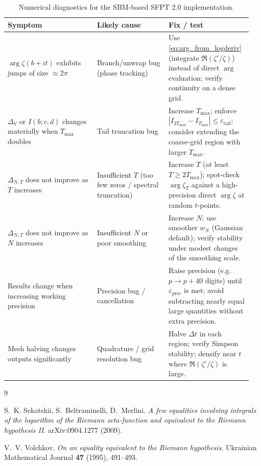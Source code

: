 \documentclass[11pt]{article}
\theoremstyle{definition}
\begin{document}
\begin{table}[h]
\centering
\begin{tabular}{p{0.35\linewidth} p{0.28\linewidth} p{0.32\linewidth}}
\hline
\textbf{Symptom} & \textbf{Likely cause} & \textbf{Fix / test} \\
\hline
\(\arg\zeta(b+it)\) exhibits jumps of size \(\approx 2\pi\) &
Branch/unwrap bug (phase tracking) &
Use \eqref{eq:arg_from_logderiv} (integrate \(\Re(\zeta'/\zeta)\)) instead of direct \(\arg\) evaluation; verify continuity on a dense grid. \\
\hline
\(\Delta_V\) or \(I(b;c,d)\) changes materially when \(T_{\max}\) doubles &
Tail truncation bug &
Increase \(T_{\max}\); enforce \(|I_{2T_{\max}}-I_{T_{\max}}|\le \varepsilon_{\mathrm{tail}}\); consider extending the coarse-grid region with larger \(T_{\max}\). \\
\hline
\(\Delta_{N,T}\) does not improve as \(T\) increases &
Insufficient \(T\) (too few zeros / spectral truncation) &
Increase \(T\) (at least \(T\ge 2T_{\max}\)); spot-check \(\arg\zeta_T\) against a high-precision direct \(\arg\zeta\) at random \(t\)-points. \\
\hline
\(\Delta_{N,T}\) does not improve as \(N\) increases &
Insufficient \(N\) or poor smoothing &
Increase \(N\); use smoother \(w_N\) (Gaussian default); verify stability under modest changes of the smoothing scale. \\
\hline
Results change when increasing working precision &
Precision bug / cancellation &
Raise precision (e.g.\ \(p\to p+40\) digits) until \(\varepsilon_{\mathrm{prec}}\) is met; avoid subtracting nearly equal large quantities without extra precision. \\
\hline
Mesh halving changes outputs significantly &
Quadrature / grid resolution bug &
Halve \(\Delta t\) in each region; verify Simpson stability; densify near \(t\) where \(\Re(\zeta'/\zeta)\) is large. \\
\hline
\end{tabular}
\caption{Numerical diagnostics for the SBM-based SFPT 2.0 implementation.}
\label{tab:diagnostics}
\end{table}



\begin{thebibliography}{9}

S.~K. Sekatskii, S.~Beltraminelli, D.~Merlini.
\newblock \emph{A few equalities involving integrals of the logarithm of the Riemann zeta-function and equivalent to the Riemann hypothesis II}.
\newblock arXiv:0904.1277 (2009).

V.~V. Volchkov.
\newblock \emph{On an equality equivalent to the Riemann hypothesis}.
\newblock Ukrainian Mathematical Journal \textbf{47} (1995), 491--493.

\end{thebibliography}
\end{document}
